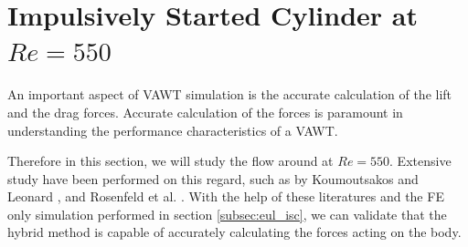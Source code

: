 






\section{Impulsively Started Cylinder at $Re=550$}
\label{sec:vvhm-isc}

An important aspect of VAWT simulation is the accurate calculation of the lift and the drag forces. Accurate calculation of the forces is paramount in understanding the performance characteristics of a VAWT.

Therefore in this section, we will study the flow around  at $Re=550$. 
Extensive study have been performed on this regard, such as by Koumoutsakos and Leonard \cite{Koumoutsakos1995a}, and 
Rosenfeld et al. \cite{MosheRosenFeldDochanKwak1991}. With the help of these literatures and the FE only simulation performed in section \ref{subsec:eul_isc}, we can validate that the hybrid method is capable of accurately calculating the forces acting on the body.

